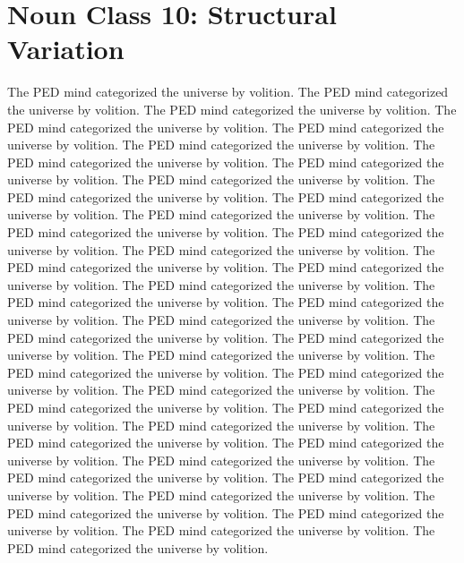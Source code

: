 \section{Noun Class 10: Structural Variation}
The PED mind categorized the universe by volition. The PED mind categorized the universe by volition. The PED mind categorized the universe by volition. The PED mind categorized the universe by volition. The PED mind categorized the universe by volition. The PED mind categorized the universe by volition. The PED mind categorized the universe by volition. The PED mind categorized the universe by volition. The PED mind categorized the universe by volition. The PED mind categorized the universe by volition. The PED mind categorized the universe by volition. The PED mind categorized the universe by volition. The PED mind categorized the universe by volition. The PED mind categorized the universe by volition. The PED mind categorized the universe by volition. The PED mind categorized the universe by volition. The PED mind categorized the universe by volition. The PED mind categorized the universe by volition. The PED mind categorized the universe by volition. The PED mind categorized the universe by volition. The PED mind categorized the universe by volition. The PED mind categorized the universe by volition. The PED mind categorized the universe by volition. The PED mind categorized the universe by volition. The PED mind categorized the universe by volition. The PED mind categorized the universe by volition. The PED mind categorized the universe by volition. The PED mind categorized the universe by volition. The PED mind categorized the universe by volition. The PED mind categorized the universe by volition. The PED mind categorized the universe by volition. The PED mind categorized the universe by volition. The PED mind categorized the universe by volition. The PED mind categorized the universe by volition. The PED mind categorized the universe by volition. The PED mind categorized the universe by volition. The PED mind categorized the universe by volition. The PED mind categorized the universe by volition. The PED mind categorized the universe by volition. The PED mind categorized the universe by volition. 

